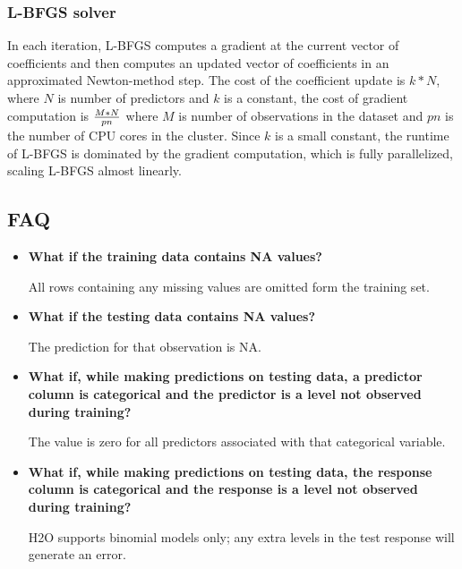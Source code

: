 \subsubsection{L-BFGS solver}
In each iteration, L-BFGS computes a gradient at the current vector of coefficients and then computes an updated vector of coefficients in an approximated Newton-method step. The cost of the coefficient update is $k*N$, where $N$ is number of predictors and $k$ is a constant, the cost of gradient computation is $M*N\over pn$ where $M$ is number of observations in the dataset and $pn$ is the number of CPU cores in the cluster. Since $k$ is a small constant, the runtime of L-BFGS is dominated by the gradient computation, which is fully parallelized, scaling L-BFGS almost linearly. 

\subsection{FAQ}

\begin{itemize}
\item \textbf{What if the training data contains NA values?}

 All rows containing any missing values are omitted form the training set. 

\item \textbf{What if the testing data contains NA values?}

 The prediction for that observation is NA.

\item \textbf{What if, while making predictions on testing data, a predictor column is categorical and the predictor is a level not observed during training?}

 The value is zero for all predictors associated with that categorical variable.

\item \textbf{What if, while making predictions on testing data, the response column is categorical and the response is a level not observed during training?} 

H2O supports binomial models only; any extra levels in the test response will generate an error.
\end{itemize}

\newpage
